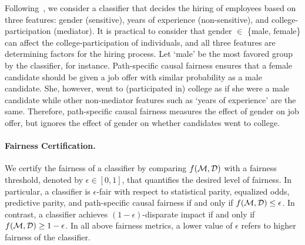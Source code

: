 \begin{example}
	\normalfont
	Following~\cite{bastani2019probabilistic}, we consider a classifier that decides the hiring of employees based on three features: gender (sensitive), years of experience (non-sensitive), and college-participation (mediator). It is practical to consider that gender $ \in $ \{male, female\} can affect the college-participation of individuals, and all three features are determining factors for the hiring process. Let `male' be the most favored group by the classifier, for instance. Path-specific causal fairness ensures that a female candidate should be given a job offer with similar probability as a male candidate. She,  however,  went to (participated in) college as if she were a male candidate while other non-mediator features such as  `years of experience' are the same.  Therefore, path-specific causal fairness measures the effect of gender on job offer, but ignores the effect of gender on whether candidates went to college.
\end{example}	



\paragraph{Fairness Certification.} We certify the fairness of a classifier by comparing $ f(\mathcal{M}, \mathcal{D}) $ with a fairness threshold, denoted by $ \epsilon \in [0,1] $, that quantifies the desired level of fairness. In particular, a classifier is $ \epsilon $-fair with respect to statistical parity, equalized odds, predictive parity, and path-specific causal fairness if and only if $ f(\mathcal{M}, \mathcal{D}) \le \epsilon $. In contrast, a classifier achieves $(1 - \epsilon)$-disparate impact  if and only if $ f(\mathcal{M}, \mathcal{D}) \ge 1 - \epsilon $. In all above fairness metrics, a lower value of $ \epsilon $ refers to higher fairness of the classifier.


